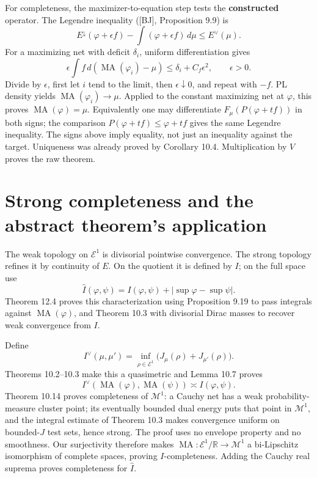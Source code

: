 \documentclass[11pt]{article}
\begin{document}
For completeness, the maximizer-to-equation step tests the
\textbf{constructed} operator. The Legendre inequality ({[}BJ{]},
Proposition 9.9) is
\[E^\downarrow(\varphi+\epsilon f)-\int(\varphi+\epsilon f)\,d\mu\leq E^\vee(\mu).\]
For a maximizing net with deficit \(\delta_i\), uniform differentiation
gives
\[\epsilon\int f\,d(\operatorname{MA}(\varphi_i)-\mu)\leq\delta_i+C_f\epsilon^2,\qquad\epsilon>0.\]
Divide by \(\epsilon\), first let \(i\) tend to the limit, then
\(\epsilon\downarrow0\), and repeat with \(-f\). PL density yields
\(\operatorname{MA}(\varphi_i)\to\mu\). Applied to the constant
maximizing net at \(\varphi\), this proves
\(\operatorname{MA}(\varphi)=\mu\). Equivalently one may differentiate
\(F_\mu(P(\varphi+tf))\) in both signs; the comparison
\(P(\varphi+tf)\leq\varphi+tf\) gives the same Legendre inequality. The
signs above imply equality, not just an inequality against the target.
Uniqueness was already proved by Corollary 10.4. Multiplication by \(V\)
proves the raw theorem.

\section{Strong completeness and the abstract theorem's
application}\label{strong-completeness-and-the-abstract-theorems-application}

The weak topology on \(\mathcal E^1\) is divisorial pointwise
convergence. The strong topology refines it by continuity of \(E\). On
the quotient it is defined by \(I\); on the full space use
\[\widehat I(\varphi,\psi)=I(\varphi,\psi)+|\sup\varphi-\sup\psi|.\]
Theorem 12.4 proves this characterization using Proposition 9.19 to pass
integrals against \(\operatorname{MA}(\varphi)\), and Theorem 10.3 with
divisorial Dirac masses to recover weak convergence from \(I\).

Define
\[I^\vee(\mu,\mu')=\inf_{\rho\in\mathcal E^1}\big(J_\mu(\rho)+J_{\mu'}(\rho)\big).\]
Theorems 10.2--10.3 make this a quasimetric and Lemma 10.7 proves
\[I^\vee(\operatorname{MA}(\varphi),\operatorname{MA}(\psi))\asymp I(\varphi,\psi).\]
Theorem 10.14 proves completeness of \(\mathcal M^1\): a Cauchy net has
a weak probability-measure cluster point; its eventually bounded dual
energy puts that point in \(\mathcal M^1\), and the integral estimate of
Theorem 10.3 makes convergence uniform on bounded-\(J\) test sets, hence
strong. The proof uses no envelope property and no smoothness. Our
surjectivity therefore makes
\(\operatorname{MA}:\mathcal E^1/\mathbb R\to\mathcal M^1\) a
bi-Lipschitz isomorphism of complete spaces, proving \(I\)-completeness.
Adding the Cauchy real suprema proves completeness for \(\widehat I\).
\end{document}
